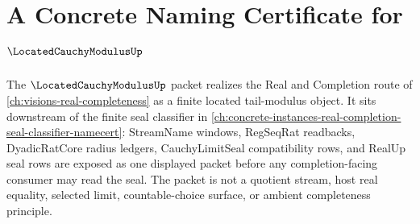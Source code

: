 \chapter{A Concrete Naming Certificate for $\LocatedCauchyModulusUp$}
\label{ch:concrete-instances-locatedcauchymodulus-namecert}

The $\LocatedCauchyModulusUp$ packet realizes the Real and Completion route of \autoref{ch:visions-real-completeness} as a finite located tail-modulus object. It sits downstream of the finite seal classifier in \autoref{ch:concrete-instances-real-completion-seal-classifier-namecert}: StreamName windows, RegSeqRat readbacks, DyadicRatCore radius ledgers, CauchyLimitSeal compatibility rows, and RealUp seal rows are exposed as one displayed packet before any completion-facing consumer may read the seal. The packet is not a quotient stream, host real equality, selected limit, countable-choice surface, or ambient completeness principle.

